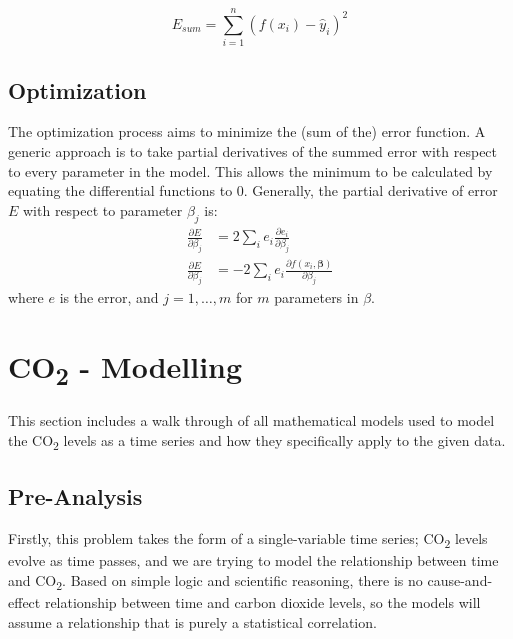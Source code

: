 \documentclass{mcmthesis}
\begin{document}
    \begin{equation}
        E_{sum} = \sum_{i=1}^{n} (f(x_i) - \hat y_i)^2
        \label{eq:model_sqd}
    \end{equation}

    \subsection{Optimization}

    The optimization process aims to minimize the (sum of the) error function.
    A generic approach is to take partial derivatives of the summed error with respect to every parameter in the model. This allows the minimum to be calculated by equating the differential functions to 0.
    Generally, the partial derivative of error $E$ with respect to parameter $\beta_j$ is:
%
    \begin{equation}
        \begin{aligned}
            \frac{\partial E}{\partial \beta_j} &= 2 \sum_i e_i \frac{\partial e_i}{\partial \beta_j} \\
            \frac{\partial E}{\partial \beta_j} &= -2\sum_i e_i\frac{\partial f(x_i,\boldsymbol \beta)}{\partial \beta_j}
        \end{aligned}
    \end{equation}
%
    \noindent where $e$ is the error, and $j = 1, \ldots, m$ for $m$ parameters in $\beta$.



    \section{CO\textsubscript{2} - Modelling}
    This section includes a walk through of all mathematical models used to model the CO\textsubscript{2} levels as a time series and how they specifically apply to the given data.

    \subsection{Pre-Analysis}
    Firstly, this problem takes the form of a single-variable time series; CO\textsubscript{2} levels evolve as time passes, and we are trying to model the relationship between time and CO\textsubscript{2}.
    Based on simple logic and scientific reasoning, there is no cause-and-effect relationship between time and carbon dioxide levels, so the models will assume a relationship that is purely a statistical correlation.
\end{document}
